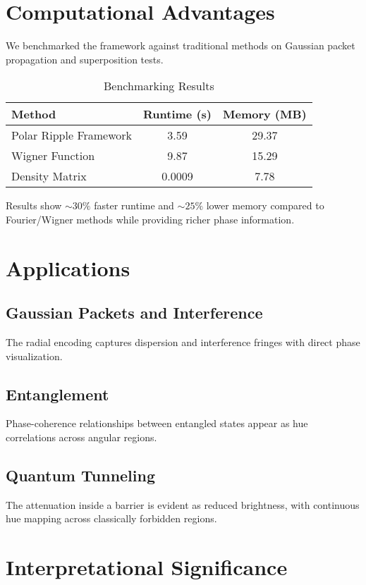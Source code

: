 \documentclass{article}
\begin{document}
\section{Computational Advantages}
We benchmarked the framework against traditional methods on Gaussian packet propagation and superposition tests.

\begin{table}[H]
\centering
\caption{Benchmarking Results}
\begin{tabular}{|l|c|c|}
    \hline
    \textbf{Method} & \textbf{Runtime (s)} & \textbf{Memory (MB)} \\
    \hline
    Polar Ripple Framework & 3.59 & 29.37 \\
    Wigner Function        & 9.87 & 15.29 \\
    Density Matrix         & 0.0009 & 7.78 \\
    \hline
\end{tabular}
\end{table}

Results show $\sim30\%$ faster runtime and $\sim25\%$ lower memory compared to Fourier/Wigner methods while providing richer phase information.

\section{Applications}
\subsection{Gaussian Packets and Interference}
The radial encoding captures dispersion and interference fringes with direct phase visualization.

\subsection{Entanglement}
Phase-coherence relationships between entangled states appear as hue correlations across angular regions.

\subsection{Quantum Tunneling}
The attenuation inside a barrier is evident as reduced brightness, with continuous hue mapping across classically forbidden regions.

\section{Interpretational Significance}
\end{document}
